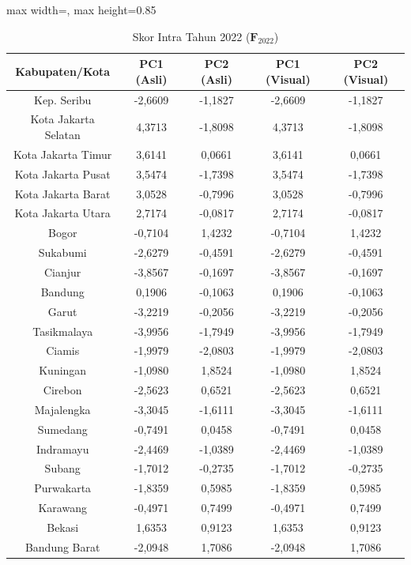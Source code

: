 \begin{table}[H]
\centering
\caption{Skor Intra Tahun 2022 ($\mathbf{F}_{2022}$)} \label{tab:app1skor_intra_2022}
\begin{adjustbox}{max width=\textwidth, max height=0.85\textheight}
\begin{tabular}{|c|c|c|c|c|}
\hline
\textbf{Kabupaten/Kota} & \textbf{PC1 (Asli)} & \textbf{PC2 (Asli)} & \textbf{PC1 (Visual)} & \textbf{PC2 (Visual)} \\
\hline
Kep. Seribu & -2,6609 & -1,1827 & -2,6609 & -1,1827 \\
Kota Jakarta Selatan & 4,3713 & -1,8098 & 4,3713 & -1,8098 \\
Kota Jakarta Timur & 3,6141 & 0,0661 & 3,6141 & 0,0661 \\
Kota Jakarta Pusat & 3,5474 & -1,7398 & 3,5474 & -1,7398 \\
Kota Jakarta Barat & 3,0528 & -0,7996 & 3,0528 & -0,7996 \\
Kota Jakarta Utara & 2,7174 & -0,0817 & 2,7174 & -0,0817 \\
Bogor & -0,7104 & 1,4232 & -0,7104 & 1,4232 \\
Sukabumi & -2,6279 & -0,4591 & -2,6279 & -0,4591 \\
Cianjur & -3,8567 & -0,1697 & -3,8567 & -0,1697 \\
Bandung & 0,1906 & -0,1063 & 0,1906 & -0,1063 \\
Garut & -3,2219 & -0,2056 & -3,2219 & -0,2056 \\
Tasikmalaya & -3,9956 & -1,7949 & -3,9956 & -1,7949 \\
Ciamis & -1,9979 & -2,0803 & -1,9979 & -2,0803 \\
Kuningan & -1,0980 & 1,8524 & -1,0980 & 1,8524 \\
Cirebon & -2,5623 & 0,6521 & -2,5623 & 0,6521 \\
Majalengka & -3,3045 & -1,6111 & -3,3045 & -1,6111 \\
Sumedang & -0,7491 & 0,0458 & -0,7491 & 0,0458 \\
Indramayu & -2,4469 & -1,0389 & -2,4469 & -1,0389 \\
Subang & -1,7012 & -0,2735 & -1,7012 & -0,2735 \\
Purwakarta & -1,8359 & 0,5985 & -1,8359 & 0,5985 \\
Karawang & -0,4971 & 0,7499 & -0,4971 & 0,7499 \\
Bekasi & 1,6353 & 0,9123 & 1,6353 & 0,9123 \\
Bandung Barat & -2,0948 & 1,7086 & -2,0948 & 1,7086 \\

\end{tabular}
\end{adjustbox}
\end{table}
